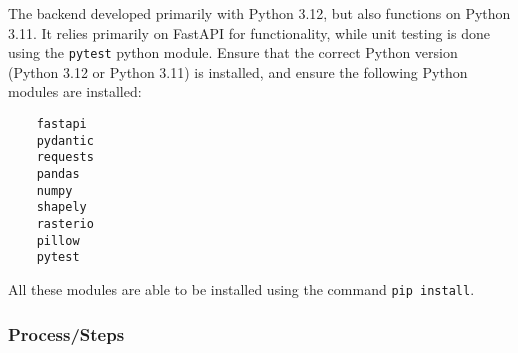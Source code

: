 \documentclass{article}
\begin{document}
The backend developed primarily with Python 3.12, but also functions on Python 3.11. It relies primarily on FastAPI for functionality, while unit testing is done using the \texttt{pytest} python module. Ensure that the correct Python version (Python 3.12 or Python 3.11) is installed, and ensure the following Python modules are installed:

\begin{verbatim}
    fastapi
    pydantic
    requests
    pandas
    numpy
    shapely
    rasterio
    pillow
    pytest
\end{verbatim}

All these modules are able to be installed using the command \texttt{pip install}.

\subsubsection{Process/Steps}
\end{document}
